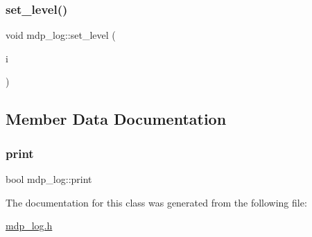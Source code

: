 \mbox{\label{classmdp__log_a368a098416aa38fa3395607848a2c5f1}} 
\subsubsection{\texorpdfstring{set\+\_\+level()}{set\_level()}}
{\footnotesize\ttfamily void mdp\+\_\+log\+::set\+\_\+level (\begin{DoxyParamCaption}\item[{int}]{i }\end{DoxyParamCaption})\hspace{0.3cm}{\ttfamily [inline]}}



\subsection{Member Data Documentation}
\mbox{\label{classmdp__log_a1330daef61266763f9a736300a1eac49}} 
\subsubsection{\texorpdfstring{print}{print}}
{\footnotesize\ttfamily bool mdp\+\_\+log\+::print}



The documentation for this class was generated from the following file\+:\begin{DoxyCompactItemize}
\item 
\hyperlink{mdp__log_8h}{mdp\+\_\+log.\+h}\end{DoxyCompactItemize}
